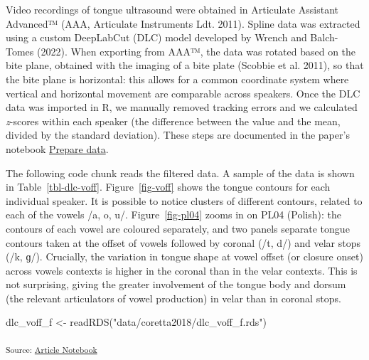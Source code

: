 \documentclass[
]{interact}
\newenvironment{Shaded}{\begin{snugshade}}{\end{snugshade}}
\newcommand{\FunctionTok}[1]{\textcolor[rgb]{0.28,0.35,0.67}{#1}}
\newcommand{\NormalTok}[1]{\textcolor[rgb]{0.00,0.23,0.31}{#1}}
\newcommand{\OtherTok}[1]{\textcolor[rgb]{0.00,0.23,0.31}{#1}}
\newcommand{\StringTok}[1]{\textcolor[rgb]{0.13,0.47,0.30}{#1}}
\begin{document}
Video recordings of tongue ultrasound were obtained in Articulate
Assistant Advanced™ (AAA, Articulate Instruments Ldt. 2011). Spline data
was extracted using a custom DeepLabCut (DLC) model developed by Wrench
and Balch-Tomes (2022). When exporting from AAA™, the data was rotated
based on the bite plane, obtained with the imaging of a bite plate
(Scobbie et al. 2011), so that the bite plane is horizontal: this allows
for a common coordinate system where vertical and horizontal movement
are comparable across speakers. Once the DLC data was imported in R, we
manually removed tracking errors and we calculated \emph{z}-scores
within each speaker (the difference between the value and the mean,
divided by the standard deviation). These steps are documented in the
paper's notebook \href{notebooks/01_prepare_data.qmd}{Prepare data}.

The following code chunk reads the filtered data. A sample of the data
is shown in Table~\ref{tbl-dlc-voff}. Figure~\ref{fig-voff} shows the
tongue contours for each individual speaker. It is possible to notice
clusters of different contours, related to each of the vowels /a, o, u/.
Figure~\ref{fig-pl04} zooms in on PL04 (Polish): the contours of each
vowel are coloured separately, and two panels separate tongue contours
taken at the offset of vowels followed by coronal (/t, d/) and velar
stops (/k, ɡ/). Crucially, the variation in tongue shape at vowel offset
(or closure onset) across vowels contexts is higher in the coronal than
in the velar contexts. This is not surprising, giving the greater
involvement of the tongue body and dorsum (the relevant articulators of
vowel production) in velar than in coronal stops.

\begin{Shaded}
\begin{Highlighting}[]
\NormalTok{dlc\_voff\_f }\OtherTok{\textless{}{-}} \FunctionTok{readRDS}\NormalTok{(}\StringTok{"data/coretta2018/dlc\_voff\_f.rds"}\NormalTok{)}
\end{Highlighting}
\end{Shaded}

\textsubscript{Source:
\href{https://stefanocoretta.github.io/mv_uti/index.qmd.html}{Article
Notebook}}
\end{document}
